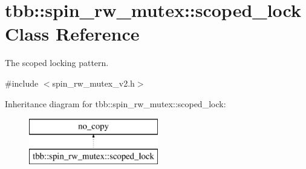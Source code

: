 \hypertarget{classtbb_1_1spin__rw__mutex_1_1scoped__lock}{}\section{tbb\+:\+:spin\+\_\+rw\+\_\+mutex\+:\+:scoped\+\_\+lock Class Reference}
\label{classtbb_1_1spin__rw__mutex_1_1scoped__lock}


The scoped locking pattern.  




{\ttfamily \#include $<$spin\+\_\+rw\+\_\+mutex\+\_\+v2.\+h$>$}

Inheritance diagram for tbb\+:\+:spin\+\_\+rw\+\_\+mutex\+:\+:scoped\+\_\+lock\+:\begin{figure}[H]
\begin{center}
\leavevmode
\includegraphics[height=2.000000cm]{classtbb_1_1spin__rw__mutex_1_1scoped__lock}
\end{center}
\end{figure}

